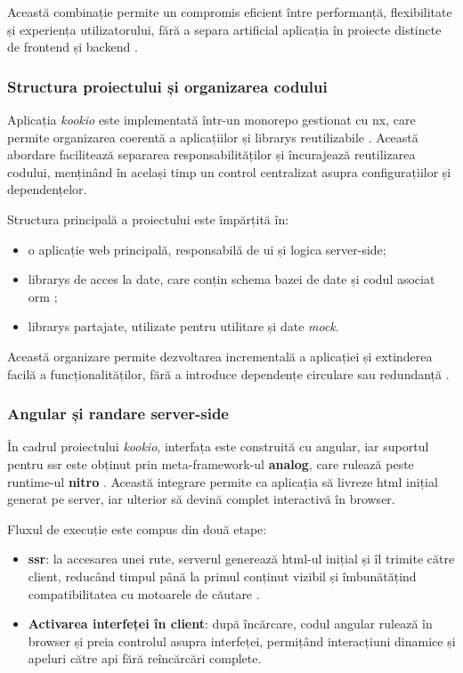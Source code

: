 Această combinație permite un compromis eficient între performanță, flexibilitate și experiența utilizatorului, fără a separa artificial aplicația în proiecte distincte de \gls{frontend} și \gls{backend} \cite{analog,nitro}.

\subsubsection{Structura proiectului și organizarea codului}

Aplicația \textit{\gls{kookio}} este implementată într-un \gls{monorepo} gestionat cu \gls{nx}, care permite organizarea coerentă a aplicațiilor și \glspl{library} reutilizabile \cite{nx}.
Această abordare facilitează separarea responsabilităților și încurajează reutilizarea codului, menținând în același timp un control centralizat asupra configurațiilor și dependențelor.

Structura principală a proiectului este împărțită în:
\begin{itemize}
  \item o aplicație \gls{web} principală, responsabilă de \acrshort{ui} și logica server-side;
  \item \glspl{library} de acces la date, care conțin schema bazei de date și codul asociat \acrfull{orm} \cite{prisma};
  \item \glspl{library} partajate, utilizate pentru utilitare și date \textit{mock}.
\end{itemize}

Această organizare permite dezvoltarea incrementală a aplicației și extinderea facilă a funcționalităților, fără a introduce dependențe circulare sau redundanță \cite{nx}.

\subsubsection{Angular și randare server-side}

În cadrul proiectului \textit{\gls{kookio}}, interfața este construită cu \gls{angular}, iar suportul pentru \acrlong{ssr} este obținut prin meta-framework-ul \textbf{\gls{analog}}, care rulează peste runtime-ul \textbf{\gls{nitro}} \cite{analog,nitro}.
Această integrare permite ca aplicația să livreze \acrshort{html} inițial generat pe server, iar ulterior să devină complet interactivă în browser.

Fluxul de execuție este compus din două etape:
\begin{itemize}
  \item \textbf{\Acrfull{ssr}}: la accesarea unei rute, serverul generează \acrshort{html}-ul inițial și îl trimite către client, reducând timpul până la primul conținut vizibil și îmbunătățind compatibilitatea cu motoarele de căutare \cite{analog,nitro}.
  \item \textbf{Activarea interfeței în client}: după încărcare, codul \gls{angular} rulează în browser și preia controlul asupra interfeței, permițând interacțiuni dinamice și apeluri către \acrshort{api} fără reîncărcări complete.
\end{itemize}

